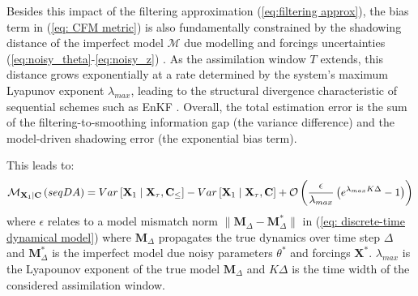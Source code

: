 \documentclass[10pt]{article}
\begin{document}
Besides this impact of the filtering approximation (\ref{eq:filtering approx}), the bias term in (\ref{eq: CFM metric}) is also fundamentally constrained by the shadowing distance of the imperfect model $\mathcal{M}$ due modelling and forcings uncertainties (\ref{eq:noisy_theta}-\ref{eq:noisy_z}) \cite{grebogi_shadowing_1990}. As the assimilation window $T$ extends, this distance grows exponentially at a rate determined by the system's maximum Lyapunov exponent $\lambda_{max}$, leading to the structural divergence characteristic of sequential schemes such as EnKF \cite{carrassi_data_2018}. Overall, the total estimation error is the sum of the filtering-to-smoothing information gap (the variance difference) and the model-driven shadowing error (the exponential bias term).


This leads to:
\begin{equation}
    \label{{eq:seqDA cfm 2}}
    \mathcal{M}_{\mathbf{X}_1\mid \mathbf{C}}\left( seqDA \right)  =
    Var \left [ \mathbf{X}_1 \mid \mathbf{X}_\tau,\mathbf{C}_\leq\right ] - Var \left [\mathbf{X}_1 \mid \mathbf{X}_\tau,\mathbf{C}\right ] 
    + \mathcal{O}\left( \frac{\epsilon}{\lambda_{max}} \left (  e^{\lambda_{max} K\Delta} -1\right)  \right ) 
\end{equation}
where $\epsilon$ relates to a model mismatch norm $\|\mathbf{M}_\Delta - \mathbf{M}^*_\Delta\|$ in (\ref{eq: discrete-time dynamical model}) where $\mathbf{M}_\Delta$ propagates the true dynamics over time step $\Delta$ and $\mathbf{M}^*_\Delta$ is the imperfect model due noisy parameters $\theta^*$ and forcings $\mathbf{X}^*$. $\lambda_{max}$ is the Lyapounov exponent of the true model $\mathbf{M}_\Delta$ and $K\Delta$ is the time width of the considered assimilation window. 
\end{document}
